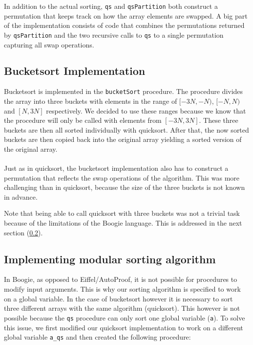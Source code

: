 In addition to the actual sorting, \texttt{qs} and \texttt{qsPartition} both construct a permutation that
keeps track on how the array elements are swapped. A big part of the implementation consists of code that
combines the permutations returned by \texttt{qsPartition} and the two recursive calls to \texttt{qs} to a single permutation
capturing all swap operations.

\subsection{Bucketsort Implementation}

Bucketsort is implemented in the \texttt{bucketSort} procedure.  
The procedure divides the array into three buckets with elements in the range of $[-3N, -N)$, $[-N,N)$ and
$[N,3N]$ respectively. 
We decided to use these ranges because we know that the procedure will only be called with elements from $[-3N,3N]$.
These three buckets are then all sorted individually with quicksort. 
After that, the now sorted buckets are then copied back into the original array yielding a sorted version
of the original array.
\\\\
Just as in quicksort, the bucketsort implementation also has to construct a permutation that reflects
the swap operations of the algorithm. This was more challenging than in quicksort, because the size of the
three buckets is not known in advance.

Note that being able to call quicksort with three buckets was not a trivial task because of the limitations
of the Boogie language. This is addressed in the next section (\ref{sec:mod_sort}).

\subsection{Implementing modular sorting algorithm}
\label{sec:mod_sort}

In Boogie, as opposed to Eiffel/AutoProof, it is not possible for procedures to modify input
arguments. This is why our sorting algorithm is specified to work on a global variable. 
In the case of bucketsort however it is necessary to sort three different arrays with the
same algorithm (quicksort). This however is not possible because the \texttt{qs} procedure
can only sort one global variable (\texttt{a}). To solve this issue, we first modified our quicksort implementation
to work on a different global variable \texttt{a\_qs} and then created the following procedure:

